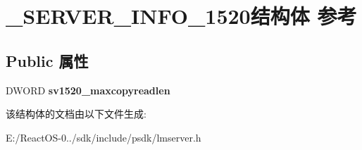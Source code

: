 \hypertarget{struct___s_e_r_v_e_r___i_n_f_o__1520}{}\section{\+\_\+\+S\+E\+R\+V\+E\+R\+\_\+\+I\+N\+F\+O\+\_\+1520结构体 参考}
\label{struct___s_e_r_v_e_r___i_n_f_o__1520}
\subsection*{Public 属性}
\begin{DoxyCompactItemize}
\item 
\mbox{\label{struct___s_e_r_v_e_r___i_n_f_o__1520_aceeff12dff8c78e1321175f0e37d62ae}} 
D\+W\+O\+RD {\bfseries sv1520\+\_\+maxcopyreadlen}
\end{DoxyCompactItemize}


该结构体的文档由以下文件生成\+:\begin{DoxyCompactItemize}
\item 
E\+:/\+React\+O\+S-\/0../sdk/include/psdk/lmserver.\+h\end{DoxyCompactItemize}
